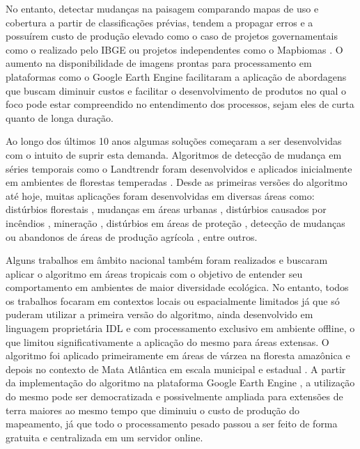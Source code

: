 \documentclass[12pt,a4paper]{article}
\begin{document}
No entanto, detectar mudanças na paisagem comparando mapas de uso e cobertura a partir de classificações prévias, tendem a propagar erros e a possuírem custo de produção elevado como o caso de projetos governamentais como o realizado pelo IBGE \citep{ibge2020} ou projetos independentes como o Mapbiomas \citep{Souza2019}. O aumento na disponibilidade de imagens prontas para processamento  \citep{rs12030426} em plataformas como o Google Earth Engine facilitaram a aplicação de abordagens que buscam diminuir custos e facilitar o desenvolvimento de produtos no qual o foco pode estar compreendido no entendimento dos processos, sejam eles de curta quanto de longa duração.

Ao longo dos últimos 10 anos algumas soluções começaram a ser desenvolvidas com o intuito de suprir esta demanda. Algoritmos de detecção de mudança em séries temporais como o Landtrendr foram desenvolvidos e aplicados inicialmente em ambientes de florestas temperadas \citep{KENNEDY2012117}. Desde as primeiras versões do algoritmo até hoje, muitas aplicações foram desenvolvidas em diversas áreas como: distúrbios florestais \citep{rs9050479, rs12223720}, mudanças em áreas urbanas \citep{rs12182883, rs13132438}, distúrbios causados por incêndios \citep{rs12091499, rs12233942}, mineração \citep{rs12101612, rs12142235}, distúrbios em áreas de proteção \citep{rs13091800}, detecção de mudanças ou abandonos de áreas de produção agrícola \citep{YIN201812, rs11101234, KOLECKA2021112340, DARA201849}, entre outros.

Alguns trabalhos em âmbito nacional também foram realizados e buscaram aplicar o algoritmo em áreas tropicais com o objetivo de entender seu comportamento em ambientes de maior diversidade ecológica. No entanto, todos os trabalhos focaram em contextos locais ou espacialmente limitados já que só puderam utilizar a primeira versão do algoritmo, ainda desenvolvido em linguagem proprietária IDL e com processamento exclusivo em ambiente offline, o que limitou significativamente a aplicação do mesmo para áreas extensas. O algoritmo foi aplicado primeiramente em áreas de várzea na floresta amazônica \citep{FRAGAL2016} e depois no contexto de Mata Atlântica em escala municipal \citep{Zebende2020} e estadual \citep{Weckmuller2019}. A partir da implementação do algoritmo na plataforma Google Earth Engine \citep{Kennedy2018}, a utilização do mesmo pode ser democratizada e possivelmente ampliada para extensões de terra maiores ao mesmo tempo que diminuiu o custo de produção do mapeamento, já que todo o processamento pesado passou a ser feito de forma gratuita e centralizada em um servidor online.
\end{document}
